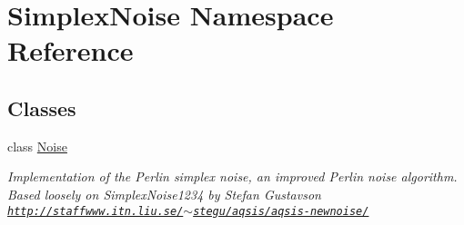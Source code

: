 \hypertarget{namespace_simplex_noise}{}\section{Simplex\+Noise Namespace Reference}
\label{namespace_simplex_noise}
\subsection*{Classes}
\begin{DoxyCompactItemize}
\item 
class \hyperlink{class_simplex_noise_1_1_noise}{Noise}
\begin{DoxyCompactList}\small\item\em Implementation of the Perlin simplex noise, an improved Perlin noise algorithm. Based loosely on Simplex\+Noise1234 by Stefan Gustavson \href{http://staffwww.itn.liu.se/~stegu/aqsis/aqsis-newnoise/}{\tt http\+://staffwww.\+itn.\+liu.\+se/$\sim$stegu/aqsis/aqsis-\/newnoise/} \end{DoxyCompactList}\end{DoxyCompactItemize}
